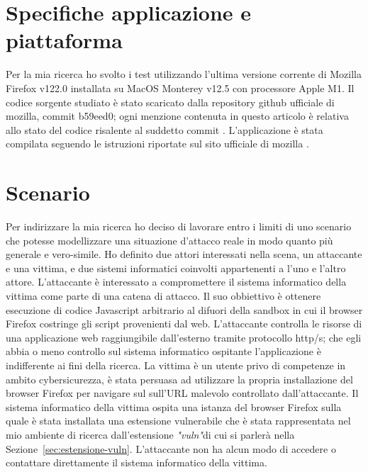 \documentclass{sapthesis}
\newcommand{\Sezione}[1]{Sezione~\ref{#1}}
\newcommand{\vuln}{\textit{"vuln"}}
\begin{document}
    \section{Specifiche applicazione e piattaforma}
    \label{sec:specifiche-e-piattaforma}
        Per la mia ricerca ho svolto i test utilizzando l'ultima versione corrente di
        Mozilla Firefox v122.0 installata su MacOS Monterey v12.5 con processore Apple M1.
        Il codice sorgente studiato è stato scaricato dalla repository github ufficiale di mozilla,
        commit b59eed0; ogni menzione contenuta in questo articolo è relativa allo stato del codice
        risalente al suddetto commit \cite{mozilla-gecko-dev}. 
        L'applicazione è stata compilata seguendo le istruzioni riportate sul sito ufficiale di mozilla \cite{mozilla-build-firefox}.

    \section{Scenario}
    \label{sec:threat-scenario}
        Per indirizzare la mia ricerca ho deciso di lavorare entro i limiti di uno scenario
        che potesse modellizzare una situazione d'attacco reale in modo quanto più generale e vero-simile.
        Ho definito due attori interessati nella scena, un attaccante e una vittima, e due sistemi
        informatici coinvolti appartenenti a l'uno e l'altro attore.
        L'attaccante è interessato a compromettere il sistema informatico della vittima come parte di 
        una catena di attacco. Il suo obbiettivo è ottenere esecuzione di codice Javascript arbitrario
        al difuori della sandbox in cui il browser Firefox costringe gli script provenienti dal web.
        L'attaccante controlla le risorse di una applicazione web raggiungibile dall'esterno tramite 
        protocollo http/s; che egli abbia o meno controllo sul sistema informatico ospitante l'applicazione
        è indifferente ai fini della ricerca.
        La vittima è un utente privo di competenze in ambito cybersicurezza, è stata persuasa ad utilizzare
        la propria installazione del browser Firefox per navigare sul sull'URL malevolo controllato
        dall'attaccante.
        Il sistema informatico della vittima ospita una istanza del browser Firefox sulla
        quale è stata installata una estensione vulnerabile che è stata rappresentata nel mio ambiente
        di ricerca dall'estensione \vuln di cui si parlerà nella \Sezione{sec:estensione-vuln}.
        L'attaccante non ha alcun modo di accedere o contattare direttamente il sistema informatico della vittima. 
\end{document}

